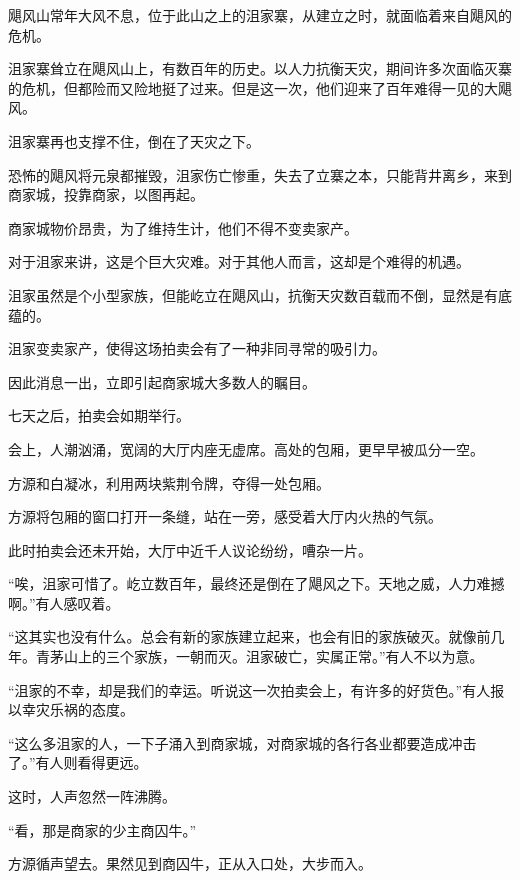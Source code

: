
\begin{this_body}



飓风山常年大风不息，位于此山之上的沮家寨，从建立之时，就面临着来自飓风的危机。

沮家寨耸立在飓风山上，有数百年的历史。以人力抗衡天灾，期间许多次面临灭寨的危机，但都险而又险地挺了过来。但是这一次，他们迎来了百年难得一见的大飓风。

沮家寨再也支撑不住，倒在了天灾之下。

恐怖的飓风将元泉都摧毁，沮家伤亡惨重，失去了立寨之本，只能背井离乡，来到商家城，投靠商家，以图再起。

商家城物价昂贵，为了维持生计，他们不得不变卖家产。

对于沮家来讲，这是个巨大灾难。对于其他人而言，这却是个难得的机遇。

沮家虽然是个小型家族，但能屹立在飓风山，抗衡天灾数百载而不倒，显然是有底蕴的。

沮家变卖家产，使得这场拍卖会有了一种非同寻常的吸引力。

因此消息一出，立即引起商家城大多数人的瞩目。

七天之后，拍卖会如期举行。

会上，人潮汹涌，宽阔的大厅内座无虚席。高处的包厢，更早早被瓜分一空。

方源和白凝冰，利用两块紫荆令牌，夺得一处包厢。

方源将包厢的窗口打开一条缝，站在一旁，感受着大厅内火热的气氛。

此时拍卖会还未开始，大厅中近千人议论纷纷，嘈杂一片。

“唉，沮家可惜了。屹立数百年，最终还是倒在了飓风之下。天地之威，人力难撼啊。”有人感叹着。

“这其实也没有什么。总会有新的家族建立起来，也会有旧的家族破灭。就像前几年。青茅山上的三个家族，一朝而灭。沮家破亡，实属正常。”有人不以为意。

“沮家的不幸，却是我们的幸运。听说这一次拍卖会上，有许多的好货色。”有人报以幸灾乐祸的态度。

“这么多沮家的人，一下子涌入到商家城，对商家城的各行各业都要造成冲击了。”有人则看得更远。

这时，人声忽然一阵沸腾。

“看，那是商家的少主商囚牛。”

方源循声望去。果然见到商囚牛，正从入口处，大步而入。


\end{this_body}
